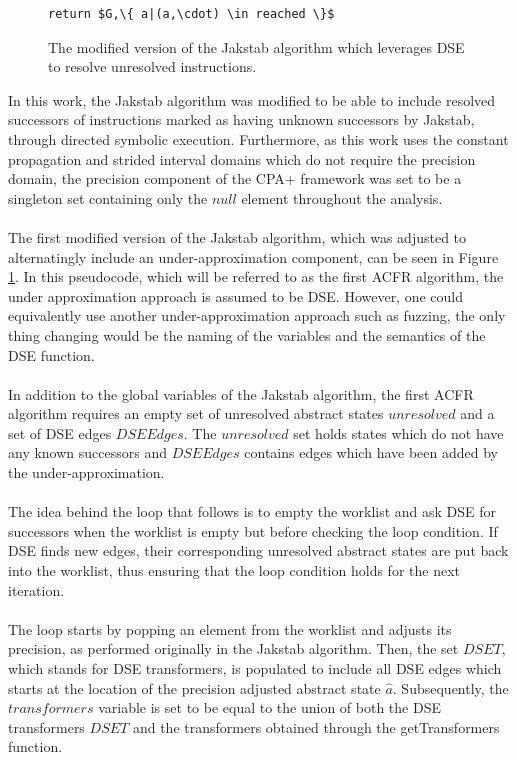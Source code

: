 \documentclass{kththesis}
\begin{document}
\begin{figure}[htb]
\begin{algorithmFrame}
\begin{lstlisting}[style=algorithm]
return $G,\{ a|(a,\cdot) \in reached \}$
\end{lstlisting}
\end{algorithmFrame}
\caption[The modified version of the Jakstab algorithm which leverages DSE to resolve unresolved instructions.]{The modified version of the Jakstab algorithm which leverages DSE to resolve unresolved instructions.}
    \label{fig:ACFR1}
\end{figure}
\clearpage
\noindent
In this work, the Jakstab algorithm was modified to be able to include resolved successors of instructions marked as having unknown successors by Jakstab, through directed symbolic execution. Furthermore, as this work uses the constant propagation and strided interval domains which do not require the precision domain, the precision component of the CPA+ framework was set to be a singleton set containing only the $null$ element throughout the analysis.
\\ \\
The first modified version of the Jakstab algorithm, which was adjusted to alternatingly include an under-approximation component, can be seen in Figure \ref{fig:ACFR1}. In this pseudocode, which will be referred to as the first ACFR algorithm, the under approximation approach is assumed to be DSE. However, one could equivalently use another under-approximation approach such as fuzzing, the only thing changing would be the naming of the variables and the semantics of the DSE function.
\\ \\
In addition to the global variables of the Jakstab algorithm, the first ACFR algorithm requires an empty set of unresolved abstract states $unresolved$ and a set of DSE edges $DSEEdges$. The $unresolved$ set holds states which do not have any known successors and $DSEEdges$ contains edges which have been added by the under-approximation. 
\\ \\
The idea behind the loop that follows is to empty the worklist and ask DSE for successors when the worklist is empty but before checking the loop condition. If DSE finds new edges, their corresponding unresolved abstract states are put back into the worklist, thus ensuring that the loop condition holds for the next iteration.
\\ \\
The loop starts by popping an element from the worklist and adjusts its precision, as performed originally in the Jakstab algorithm. Then, the set $DSET$, which stands for DSE transformers, is populated to include all DSE edges which starts at the location of the precision adjusted abstract state $\hat{a}$. Subsequently, the $transformers$ variable is set to be equal to the union of both the DSE transformers $DSET$ and the transformers obtained through the getTransformers function.
\end{document}
